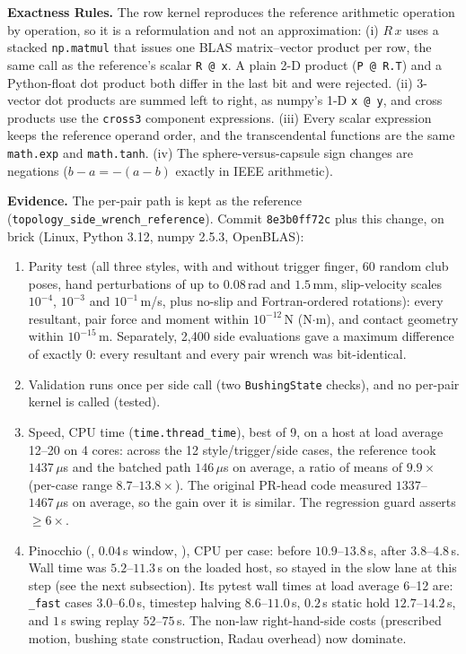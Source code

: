 \documentclass[11pt,a4paper]{article}
\begin{document}
\textbf{Exactness Rules.} The row kernel reproduces the reference arithmetic operation by operation, so it is a
reformulation and not an approximation:
(i) $R\,x$ uses a stacked \texttt{np.matmul} that issues one BLAS matrix--vector product per row, the same call as the
reference's scalar \texttt{R @ x}. A plain 2-D product (\texttt{P @ R.T}) and a Python-float dot product both differ in the
last bit and were rejected.
(ii) $3$-vector dot products are summed left to right, as numpy's 1-D \texttt{x @ y}, and cross products use the
\texttt{cross3} component expressions.
(iii) Every scalar expression keeps the reference operand order, and the transcendental functions are the same
\texttt{math.exp} and \texttt{math.tanh}.
(iv) The sphere-versus-capsule sign changes are negations ($b - a = -(a - b)$ exactly in IEEE arithmetic).

\textbf{Evidence.} The per-pair path is kept as the reference (\texttt{topology\_side\_wrench\_reference}). Commit
\texttt{8e3b0ff72c} plus this change, on brick (Linux, Python 3.12, numpy 2.5.3, OpenBLAS):
\begin{enumerate}[leftmargin=*,noitemsep]
\item Parity test (all three styles, with and without trigger finger, 60 random club poses, hand perturbations of up to
  $0.08$\,rad and $1.5$\,mm, slip-velocity scales $10^{-4}$, $10^{-3}$ and $10^{-1}$\,m/s, plus no-slip and
  Fortran-ordered rotations): every resultant, pair force and moment within $10^{-12}$\,N (N$\cdot$m), and contact geometry
  within $10^{-15}$\,m. Separately, 2{,}400 side evaluations gave a maximum difference of exactly $0$: every resultant and
  every pair wrench was bit-identical.
\item Validation runs once per side call (two \texttt{BushingState} checks), and no per-pair kernel is called (tested).
\item Speed, CPU time (\texttt{time.thread\_time}), best of 9, on a host at load average 12--20 on 4 cores: across the 12
  style/trigger/side cases, the reference took $1437\,\mu$s and the batched path $146\,\mu$s on average, a ratio of means of
  $9.9\times$ (per-case range $8.7$--$13.8\times$). The original PR-head code measured $1337$--$1467\,\mu$s on average, so
  the gain over it is similar. The regression guard asserts $\ge 6\times$.
\item Pinocchio (, $0.04$\,s window, ), CPU per case: before
  $10.9$--$13.8$\,s, after $3.8$--$4.8$\,s. Wall time was $5.2$--$11.3$\,s on the loaded host, so
   stayed in the slow lane at this step (see the next subsection). Its pytest wall times at load average 6--12 are:
  \texttt{\_fast} cases $3.0$--$6.0$\,s, timestep halving $8.6$--$11.0$\,s, $0.2$\,s static hold $12.7$--$14.2$\,s, and
  $1$\,s swing replay $52$--$75$\,s. The non-law right-hand-side costs (prescribed motion, bushing state construction,
  Radau overhead) now dominate.
\end{enumerate}
\end{document}
